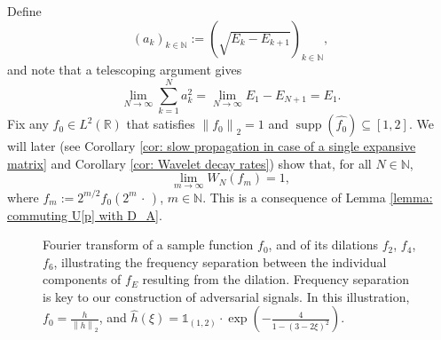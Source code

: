 \documentclass[11pt]{amsart}
\newcommand{\R}{{\mathbb{R}}}
\newcommand{\N}{\mathbb{N}}
\newcommand{\norm}[1]{\ensuremath{\left\lVert\text{}#1\text{}\right\rVert}}
\DeclareMathOperator{\supp}{supp}
\newenvironment{proof sketch} {\textit{Proof sketch.}}{}
\begin{document}
  \begin{proof sketch}
  Define 
  \[(a_k)_{k \in \N}:=\left(\sqrt{E_k-E_{k+1}}\right)_{k \in \N},\] 
  and note that a telescoping argument gives 
  \[\lim_{N \to \infty} \sum_{k=1}^N a_k^2 = \lim_{N \to \infty} E_1-E_{N+1}=E_1.\] 
  Fix any $f_0 \in L^2(\R)$ that satisfies $\norm{f_0}_2=1$ and $\supp(\widehat{f_0})\subseteq [1,2]$. We will later (see Corollary \ref{cor: slow propagation in case of a single expansive matrix} and Corollary \ref{cor: Wavelet decay rates}) show that, for all $N \in \N$,
  \[\lim_{m \to \infty} W_N\left(f_m\right)=1,\]
  where $f_m:=2^{m/2}f_0(2^m \,\cdot\,)$, $m \in \N$. This is a consequence of Lemma \ref{lemma: commuting U[p] with D_A}. 
  \begin{figure}[t!]
    \centering
    \begin{minipage}{0.999\textwidth}
      \centering
      \resizebox{0.999\textwidth}{!}{} 
    \end{minipage}\hfill
    \captionsetup{width=.78\linewidth}
    \caption{Fourier transform of a sample function $f_0$, and of its dilations $f_2$, $f_4$, $f_6$, illustrating the frequency separation between the individual components of $f_E$ resulting from the dilation. Frequency separation is key to our construction of adversarial signals. In this illustration, $f_0=\frac{h}{\norm{h}_2}$, and $\widehat{h}(\xi)=\mathds{1}_{(1,2)} \cdot \exp\left(-\frac{4}{1-(3-2\xi)^2}\right)$.}
    \label{fig: f_0 Fourier dilations}
  \end{figure}


\end{proof sketch}
\end{document}
